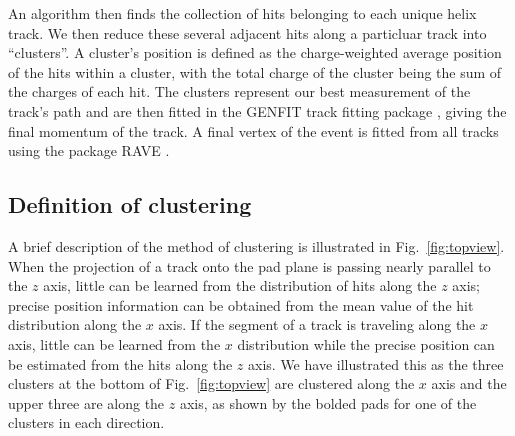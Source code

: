 \documentclass[review,number,sort&compress]{elsarticle}
\begin{document}
 An algorithm then finds the collection of hits belonging to each unique helix track. We then reduce these several adjacent hits along a particluar track into ``clusters''. A cluster's position is defined as the charge-weighted average position of the hits within a cluster, with the total charge of the cluster being the sum of the charges of each hit. The clusters represent our best measurement of the track's path and are then fitted in the GENFIT track fitting package \cite{genfit}, giving the final momentum of the track. A final vertex of the event is fitted from all tracks using the package RAVE \cite{rave}. 
 

\subsection{Definition of clustering}
A brief description of the method of clustering is illustrated in Fig.~\ref{fig:topview}. When the projection of a track onto the pad plane is passing nearly parallel to the $z$ axis, little can be learned from the distribution of hits along the $z$ axis; precise position information can be obtained from the mean value of the hit distribution along the $x$ axis. If the segment of a track is traveling along the $x$ axis, little can be learned from the $x$ distribution while the precise position can be estimated from the hits along the $z$ axis. We have illustrated this as the three clusters at the bottom of Fig.~\ref{fig:topview} are clustered along the $x$ axis and the upper three are along the $z$ axis, as shown by the bolded pads for one of the clusters in each direction.
\end{document}

